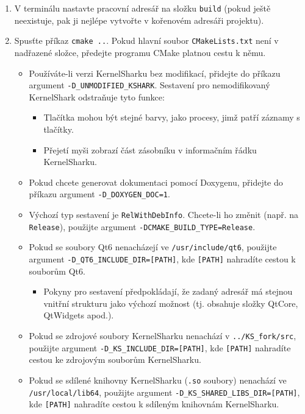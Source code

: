 \begin{enumerate}
  \item V terminálu nastavte pracovní adresář na složku \texttt{build} (pokud ještě neexistuje, pak ji nejlépe vytvořte v kořenovém adresáři projektu).
  \item Spusťte příkaz \texttt{cmake ..}. Pokud hlavní soubor \texttt{CMakeLists.txt} není v nadřazené složce, předejte programu CMake platnou cestu k němu.
    \begin{itemize}
      \item Používáte-li verzi KernelSharku bez modifikací, přidejte do příkazu argument \texttt{-D\_UNMODIFIED\_KSHARK}.
      Sestavení pro nemodifikovaný KernelShark odstraňuje tyto funkce:
      \begin{itemize}
        \item Tlačítka mohou být stejné barvy, jako procesy, jimž patří záznamy s tlačítky.
        \item Přejetí myši zobrazí část zásobníku v informačním řádku KernelSharku.
      \end{itemize}
      \item Pokud chcete generovat dokumentaci pomocí Doxygenu, přidejte do příkazu argument \texttt{-D\_DOXYGEN\_DOC=1}.
      \item Výchozí typ sestavení je \texttt{RelWithDebInfo}. Chcete-li ho změnit (např. na \texttt{Release}), použijte argument \texttt{-DCMAKE\_BUILD\_TYPE=Release}.
      \item Pokud se soubory Qt6 nenacházejí ve \texttt{/usr/include/qt6}, použijte argument \texttt{-D\_QT6\_INCLUDE\_DIR=[PATH]}, kde \texttt{[PATH]} nahradíte cestou k souborům Qt6.
        \begin{itemize}
          \item Pokyny pro sestavení předpokládají, že zadaný adresář má stejnou vnitřní strukturu jako výchozí možnost (tj. obsahuje složky QtCore, QtWidgets apod.).
        \end{itemize}
      \item Pokud se zdrojové soubory KernelSharku nenachází v \texttt{../KS\_fork/src}, použijte argument \texttt{-D\_KS\_INCLUDE\_DIR=[PATH]}, kde \texttt{[PATH]} nahradíte cestou ke zdrojovým souborům KernelSharku.
      \item Pokud se sdílené knihovny KernelSharku (\texttt{.so} soubory) nenachází ve \texttt{/usr/local/lib64}, použijte argument \texttt{-D\_KS\_SHARED\_LIBS\_DIR=[PATH]}, kde \texttt{[PATH]} nahradíte cestou k sdíleným knihovnám KernelSharku.
    \end{itemize}

\end{enumerate}
